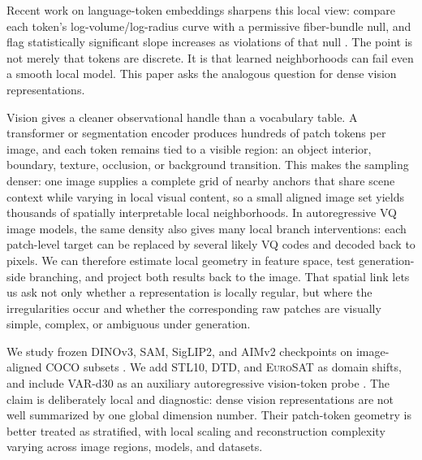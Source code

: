 \documentclass{article}
\newcommand{\dataset}[1]{\textsc{#1}}
\begin{document}
Recent work on language-token embeddings sharpens this local view: compare each token's log-volume/log-radius curve with a permissive fiber-bundle null, and flag statistically significant slope increases as violations of that null \citep{robinson2025token}. The point is not merely that tokens are discrete. It is that learned neighborhoods can fail even a smooth local model. This paper asks the analogous question for dense vision representations.

Vision gives a cleaner observational handle than a vocabulary table. A transformer or segmentation encoder produces hundreds of patch tokens per image, and each token remains tied to a visible region: an object interior, boundary, texture, occlusion, or background transition. This makes the sampling denser: one image supplies a complete grid of nearby anchors that share scene context while varying in local visual content, so a small aligned image set yields thousands of spatially interpretable local neighborhoods. In autoregressive VQ image models, the same density also gives many local branch interventions: each patch-level target can be replaced by several likely VQ codes and decoded back to pixels. We can therefore estimate local geometry in feature space, test generation-side branching, and project both results back to the image. That spatial link lets us ask not only whether a representation is locally regular, but where the irregularities occur and whether the corresponding raw patches are visually simple, complex, or ambiguous under generation.

We study frozen DINOv3, SAM, SigLIP2, and AIMv2 checkpoints on image-aligned \dataset{COCO} subsets \citep{simeoni2025dinov3,kirillov2023segment,tschannen2025siglip2,elnouby2024aimv2,lin2014microsoft}. We add \dataset{STL10}, \dataset{DTD}, and \dataset{EuroSAT} as domain shifts, and include VAR-d30 as an auxiliary autoregressive vision-token probe \citep{tian2024visual}. The claim is deliberately local and diagnostic: dense vision representations are not well summarized by one global dimension number. Their patch-token geometry is better treated as stratified, with local scaling and reconstruction complexity varying across image regions, models, and datasets.
\end{document}
